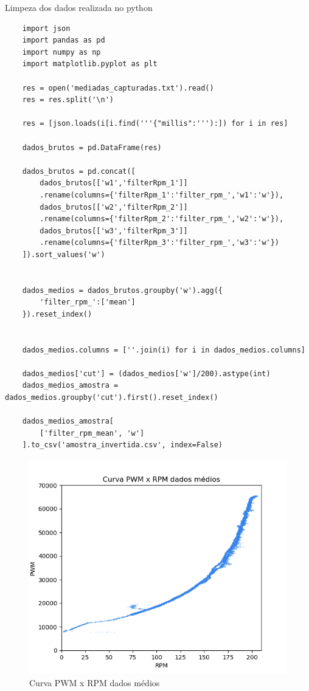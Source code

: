 Limpeza dos dados realizada no python
\lstset{language=Python}
\begin{lstlisting}
    import json
    import pandas as pd
    import numpy as np
    import matplotlib.pyplot as plt
    
    res = open('mediadas_capturadas.txt').read()
    res = res.split('\n')
    
    res = [json.loads(i[i.find('''{"millis":'''):]) for i in res]
    
    dados_brutos = pd.DataFrame(res)
    
    dados_brutos = pd.concat([
        dados_brutos[['w1','filterRpm_1']]
        .rename(columns={'filterRpm_1':'filter_rpm_','w1':'w'}),
        dados_brutos[['w2','filterRpm_2']]
        .rename(columns={'filterRpm_2':'filter_rpm_','w2':'w'}),
        dados_brutos[['w3','filterRpm_3']]
        .rename(columns={'filterRpm_3':'filter_rpm_','w3':'w'})
    ]).sort_values('w')
    
    
    dados_medios = dados_brutos.groupby('w').agg({
        'filter_rpm_':['mean']
    }).reset_index()
    
    
    dados_medios.columns = [''.join(i) for i in dados_medios.columns]
    
    dados_medios['cut'] = (dados_medios['w']/200).astype(int)
    dados_medios_amostra = dados_medios.groupby('cut').first().reset_index()
    
    dados_medios_amostra[
        ['filter_rpm_mean', 'w']
    ].to_csv('amostra_invertida.csv', index=False)

\end{lstlisting}


\begin{figure}[h]
	\centering
	\includegraphics{figures/curva_pwm_x_rpm_dados_medios}
	\caption{Curva PWM x RPM dados médios}
	\label{lof}
\end{figure}


